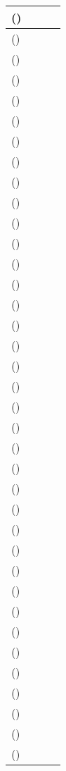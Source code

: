 \documentclass[12pt]{article}
\begin{document}
\begin{longtable}{  | p{3cm} | p{4.5cm} | p{2.95cm} | p{3.95cm} | }
   \emph{} () &  &  & \\
\hline
  \emph{} ()  &  &  & \\
\hline
  \emph{} ()  &  &  & \\
\hline
  \emph{} ()  &  &  & \\
\hline
  \emph{} () &  &  & \\
\hline
   \emph{} () &  &  & \\
\hline
  \emph{} ()  &  &  & \\
\hline
   \emph{} () &  &  & \\
\hline
  \emph{} ()  &  &  & \\
\hline
   \emph{} () &  &  & \\
\hline
  \emph{} ()  &  &  & \\
\hline
   \emph{} () &  &  & \\
\hline
  \emph{} () &  &  & \\
\hline
   \emph{} () &  &  & \\
\hline
  \emph{} ()  &  &  & \\
\hline
  \emph{} ()  &  &  & \\
\hline
  \emph{} ()  &  &  & \\
\hline
  \emph{} () &  &  & \\
\hline
   \emph{} () &  &  & \\
\hline
  \emph{} ()  &  &  & \\
\hline
   \emph{} () &  &  & \\
\hline
  \emph{} ()  &  &  & \\
\hline
   \emph{} () &  &  & \\
\hline
  \emph{} ()  &  &  & \\
\hline
   \emph{} () &  &  & \\
\hline
  \emph{} () &  &  & \\
\hline
   \emph{} () &  &  & \\
\hline
  \emph{} ()  &  &  & \\
\hline
  \emph{} ()  &  &  & \\
\hline
  \emph{} ()  &  &  & \\
\hline
  \emph{} () &  &  & \\
\hline
   \emph{} () &  &  & \\
\hline
  \emph{} ()  &  &  & \\
\hline
   \emph{} () &  &  & \\
\hline
  \emph{} ()  &  &  & \\
\hline
   \emph{} () &  &  & \\
\hline
  \emph{} ()  &  &  & \\

\end{longtable}
\end{document}
